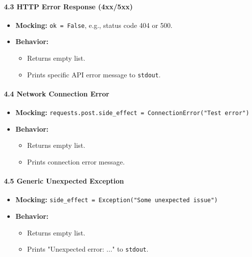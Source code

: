 \documentclass[12pt]{article}
\begin{document}
\paragraph{4.3 HTTP Error Response (4xx/5xx)}
\begin{itemize}
  \item \textbf{Mocking:} \texttt{ok = False}, e.g., status code 404 or 500.
  \item \textbf{Behavior:}
  \begin{itemize}
    \item Returns empty list.
    \item Prints specific API error message to \texttt{stdout}.
  \end{itemize}
\end{itemize}

\paragraph{4.4 Network Connection Error}
\begin{itemize}
  \item \textbf{Mocking:} \texttt{requests.post.side\_effect = ConnectionError("Test error")}
  \item \textbf{Behavior:}
  \begin{itemize}
    \item Returns empty list.
    \item Prints connection error message.
  \end{itemize}
\end{itemize}

\paragraph{4.5 Generic Unexpected Exception}
\begin{itemize}
  \item \textbf{Mocking:} \texttt{side\_effect = Exception("Some unexpected issue")}
  \item \textbf{Behavior:}
  \begin{itemize}
    \item Returns empty list.
    \item Prints "Unexpected error: ..." to \texttt{stdout}.
  \end{itemize}
\end{itemize}
\end{document}
